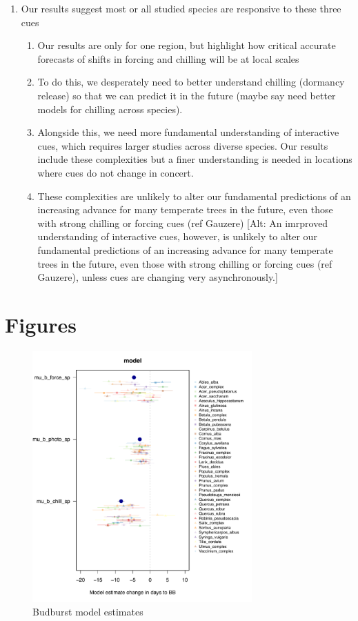 \documentclass[11pt,letter]{article}
\begin{document}
{\begin{enumerate}
\item Our results suggest most or all studied species are responsive to these three cues
\begin{enumerate}
\item Our results are only for one region, but highlight how critical accurate forecasts of shifts in forcing and chilling will be at local scales
\item To do this, we desperately need to better understand chilling (dormancy release) so that we can predict it in the future (maybe say need better models for chilling across species). 
\item Alongside this, we need more fundamental understanding of interactive cues, which requires larger studies across diverse species. Our results include these complexities but a finer understanding is needed in locations where cues do not change in concert.
\item These complexities are unlikely to alter our fundamental predictions of an increasing advance for many temperate trees in the future, even those with strong chilling or forcing cues (ref Gauzere) [Alt: An imrproved understanding of interactive cues, however, is unlikely to alter our fundamental predictions of an increasing advance for many temperate trees in the future, even those with strong chilling or forcing cues (ref Gauzere), unless cues are changing very asynchronously.]
\end{enumerate}

\end{enumerate}

\section* {Figures}

\newpage

\begin{figure}[h!]
\centering
\noindent \includegraphics[width=0.75\textwidth]{..//..//analyses/bb_analysis/figures/muplotmodelspcom_expramp_fp_chillports.pdf}
\caption{Budburst model estimates}
\label{fig:mu}
\end{figure}


}
\end{document}
